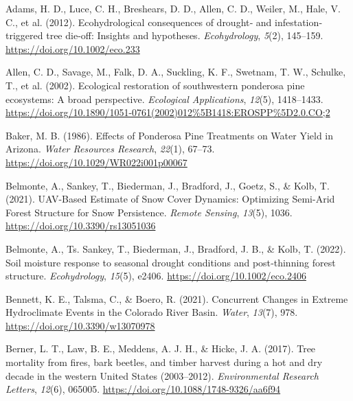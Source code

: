 \documentclass[
]{agujournal2019}
\newlength{\cslhangindent}
\newenvironment{CSLReferences}[2] %
 {\begin{list}{}{%
  \setlength{\itemindent}{0pt}
  \setlength{\leftmargin}{0pt}
  \setlength{\parsep}{0pt}
  \ifodd #1
   \setlength{\leftmargin}{\cslhangindent}
   \setlength{\itemindent}{-1\cslhangindent}
  \fi
  \setlength{\itemsep}{#2\baselineskip}}}
 {\end{list}}
\begin{document}
\label{refs}
\begin{CSLReferences}{1}{0}
\vspace{1em}

Adams, H. D., Luce, C. H., Breshears, D. D., Allen, C. D., Weiler, M.,
Hale, V. C., et al. (2012). Ecohydrological consequences of drought‐ and
infestation‐ triggered tree die‐off: Insights and hypotheses.
\emph{Ecohydrology}, \emph{5}(2), 145--159.
\url{https://doi.org/10.1002/eco.233}

Allen, C. D., Savage, M., Falk, D. A., Suckling, K. F., Swetnam, T. W.,
Schulke, T., et al. (2002). Ecological restoration of southwestern
ponderosa pine ecosystems: A broad perspective. \emph{Ecological
Applications}, \emph{12}(5), 1418--1433.
\url{https://doi.org/10.1890/1051-0761(2002)012\%5B1418:EROSPP\%5D2.0.CO;2}

Baker, M. B. (1986). Effects of {Ponderosa} {Pine} {Treatments} on
{Water} {Yield} in {Arizona}. \emph{Water Resources Research},
\emph{22}(1), 67--73. \url{https://doi.org/10.1029/WR022i001p00067}

Belmonte, A., Sankey, T., Biederman, J., Bradford, J., Goetz, S., \&
Kolb, T. (2021). {UAV}-{Based} {Estimate} of {Snow} {Cover} {Dynamics}:
{Optimizing} {Semi}-{Arid} {Forest} {Structure} for {Snow}
{Persistence}. \emph{Remote Sensing}, \emph{13}(5), 1036.
\url{https://doi.org/10.3390/rs13051036}

Belmonte, A., Ts. Sankey, T., Biederman, J., Bradford, J. B., \& Kolb,
T. (2022). Soil moisture response to seasonal drought conditions and
post‐thinning forest structure. \emph{Ecohydrology}, \emph{15}(5),
e2406. \url{https://doi.org/10.1002/eco.2406}

Bennett, K. E., Talsma, C., \& Boero, R. (2021). Concurrent {Changes} in
{Extreme} {Hydroclimate} {Events} in the {Colorado} {River} {Basin}.
\emph{Water}, \emph{13}(7), 978. \url{https://doi.org/10.3390/w13070978}

Berner, L. T., Law, B. E., Meddens, A. J. H., \& Hicke, J. A. (2017).
Tree mortality from fires, bark beetles, and timber harvest during a hot
and dry decade in the western {United} {States} (2003--2012).
\emph{Environmental Research Letters}, \emph{12}(6), 065005.
\url{https://doi.org/10.1088/1748-9326/aa6f94}


\end{CSLReferences}
\end{document}
